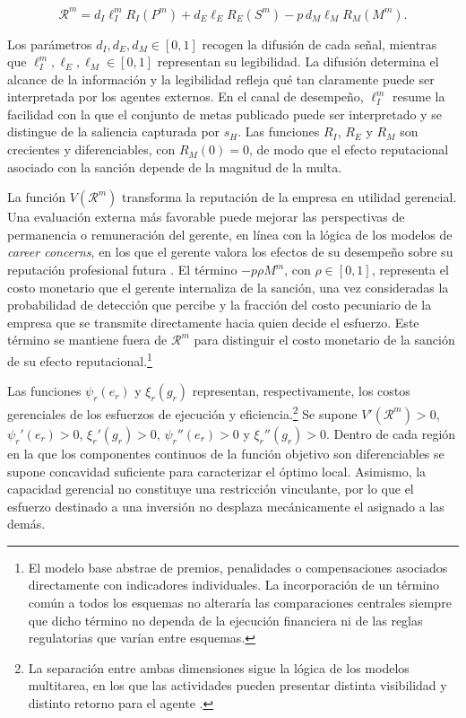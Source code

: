 \begin{equation}
\label{eq:reputacion_estructural}
\mathcal R^m
=
d_I\ell_I^m R_I(P^m)
+
d_E\ell_E R_E(S^m)
-
p\,d_M\ell_M R_M(M^m).
\end{equation}

Los parámetros \(d_I,d_E,d_M\in[0,1]\) recogen la difusión de cada señal, mientras que \(\ell_I^m,\ell_E,\ell_M\in[0,1]\) representan su legibilidad. La difusión determina el alcance de la información y la legibilidad refleja qué tan claramente puede ser interpretada por los agentes externos. En el canal de desempeño, \(\ell_I^m\) resume la facilidad con la que el conjunto de metas publicado puede ser interpretado y se distingue de la saliencia capturada por \(s_H\). Las funciones \(R_I\), \(R_E\) y \(R_M\) son crecientes y diferenciables, con \(R_M(0)=0\), de modo que el efecto reputacional asociado con la sanción depende de la magnitud de la multa.

La función \(V(\mathcal R^m)\) transforma la reputación de la empresa en utilidad gerencial. Una evaluación externa más favorable puede mejorar las perspectivas de permanencia o remuneración del gerente, en línea con la lógica de los modelos de \textit{career concerns}, en los que el gerente valora los efectos de su desempeño sobre su reputación profesional futura \citep{holmstrom1999managerial,dewatripont1999economics}. El término \(-p\rho M^m\), con \(\rho\in[0,1]\), representa el costo monetario que el gerente internaliza de la sanción, una vez consideradas la probabilidad de detección que percibe y la fracción del costo pecuniario de la empresa que se transmite directamente hacia quien decide el esfuerzo. Este término se mantiene fuera de \(\mathcal R^m\) para distinguir el costo monetario de la sanción de su efecto reputacional.\footnote{El modelo base abstrae de premios, penalidades o compensaciones asociados directamente con indicadores individuales. La incorporación de un término común a todos los esquemas no alteraría las comparaciones centrales siempre que dicho término no dependa de la ejecución financiera ni de las reglas regulatorias que varían entre esquemas.}

Las funciones \(\psi_r(e_r)\) y \(\xi_r(g_r)\) representan, respectivamente, los costos gerenciales de los esfuerzos de ejecución y eficiencia.\footnote{La separación entre ambas dimensiones sigue la lógica de los modelos multitarea, en los que las actividades pueden presentar distinta visibilidad y distinto retorno para el agente \citep{holmstrom1991multitask}.} Se supone \(V'(\mathcal R^m)>0\), \(\psi_r'(e_r)>0\), \(\xi_r'(g_r)>0\), \(\psi_r''(e_r)>0\) y \(\xi_r''(g_r)>0\). Dentro de cada región en la que los componentes continuos de la función objetivo son diferenciables se supone concavidad suficiente para caracterizar el óptimo local. Asimismo, la capacidad gerencial no constituye una restricción vinculante, por lo que el esfuerzo destinado a una inversión no desplaza mecánicamente el asignado a las demás.

